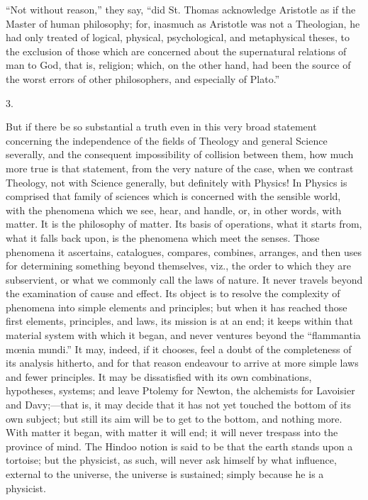 ``Not without reason,'' they say, ``did St. Thomas
acknowledge Aristotle as if the Master of human philosophy; for,
inasmuch as Aristotle was not a Theologian, he had only treated of
logical, physical, psychological, and metaphysical theses, to the
exclusion of those which are concerned about the supernatural
relations of man to God, that is, religion; which, on the other hand,
had been the source of the worst errors of other philosophers, and
especially of Plato.''

3.

But if there be so substantial a truth even in this very broad
statement concerning the independence of the fields of Theology and
general Science severally, and the consequent impossibility of
collision between them, how much more true is that statement, from the
very nature of the case, when we contrast Theology, not with Science
generally, but definitely with Physics! In Physics is comprised that
family of sciences which is concerned with the sensible world, with
the phenomena which we see, hear, and handle, or, in other words, with
matter. It is the philosophy of matter. Its basis of operations, what
it starts from, what it falls back upon, is the phenomena which meet
the senses. Those phenomena it ascertains, catalogues, compares,
combines, arranges, and then uses for determining something beyond
themselves, viz., the order to which they are subservient, or what we
commonly call the laws of nature. It never travels beyond the
examination of cause and effect. Its object is to resolve the
complexity of phenomena into simple elements and principles; but when
it has reached those first elements, principles, and laws, its mission
is at an end; it keeps within that material system with which it
began, and never ventures beyond the ``flammantia mœnia mundi.''
It may, indeed, if it chooses, feel a doubt of the completeness of its
analysis hitherto, and for that reason endeavour to arrive at more
simple laws and fewer principles. It may be dissatisfied with its own
combinations, hypotheses, systems; and leave Ptolemy for Newton, the
alchemists for Lavoisier and Davy;—that is, it may decide that it
has not yet touched the bottom of its own subject; but still its aim
will be to get to the bottom, and nothing more. With matter it began,
with matter it will end; it will never trespass into the
province of mind. The Hindoo notion is said to be that the earth
stands upon a tortoise; but the physicist, as such, will never ask
himself by what influence, external to the universe, the universe is
sustained; simply because he is a physicist.

